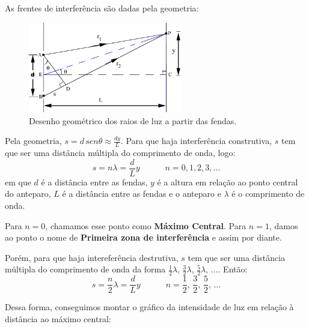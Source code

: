 \documentclass[12pt]{extarticle}
\newcommand{\<}{\langle}
\renewcommand{\>}{\rangle}
\theoremstyle{definition}
\begin{document}
As frentes de interferência são dadas pela geometria:
\begin{figure}[H]
    \centering
    \includegraphics[width=0.6\textwidth]{young1.png}
    \caption{Desenho geométrico dos raios de luz a partir das fendas.}
    \label{fig:geometria_young}
\end{figure}
Pela geometria, $s=d\, sen \theta \approx \frac{d y}{L}$. Para que haja interferência construtiva, $s$ tem que ser uma distância múltipla do comprimento de onda, logo:
\begin{equation}
    s= n\lambda = \frac{d}{L}y \quad\quad\quad n=0,1,2,3,...
\end{equation}
\noindent em que $d$ é a distância entre as fendas, $y$ é a altura em relação ao ponto central do anteparo, $L$ é a distância entre as fendas e o anteparo e $\lambda$ é o comprimento de onda.

Para $n=0$, chamamos esse ponto como \textbf{Máximo Central}. Para $n=1$, damos ao ponto o nome de \textbf{Primeira zona de interferência} e assim por diante.

Porém, para que haja intereferência destrutiva, $s$ tem que ser uma distância múltipla do comprimento de onda da forma $\frac{1}{2}\lambda,\,\frac{3}{2}\lambda,\,\frac{5}{2}\lambda,\,\dots$. Então:
\begin{equation}
    s = \frac{n}{2}\lambda = \frac{d}{L}y \quad\quad\quad n=\frac{1}{2},\,\frac{3}{2},\,\frac{5}{2},\,\dots
\end{equation}

Dessa forma, conseguimos montar o gráfico da intensidade de luz em relação à distância ao máximo central:
\end{document}
